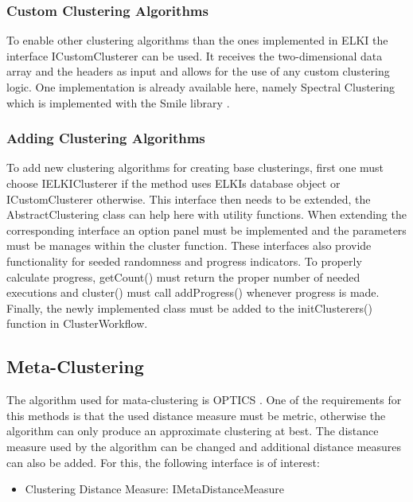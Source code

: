 \documentclass[
	a4paper,
	english,
	twoside,
	openright,               
	11pt                            
	]{report}
\begin{document}
\subsubsection{Custom Clustering Algorithms}
To enable other clustering algorithms than the ones implemented in ELKI the interface ICustomClusterer can be used. It receives the two-dimensional data array and the headers as input and allows for the use of any custom clustering logic. One implementation is already available here, namely Spectral Clustering which is implemented with the Smile library \cite{javasmile}.
 
\subsubsection*{Adding Clustering Algorithms}
To add new clustering algorithms for creating base clusterings, first one must choose IELKIClusterer if the method uses ELKIs database object or ICustomClusterer otherwise. This interface then needs to be extended, the AbstractClustering class can help here with utility functions. When extending the corresponding interface an option panel must be implemented and the parameters must be manages within the cluster function. These interfaces also provide functionality for seeded randomness and progress indicators. To properly calculate progress, getCount() must return the proper number of needed executions and cluster() must call addProgress() whenever progress is made. Finally, the newly implemented class must be added to the initClusterers() function in ClusterWorkflow.


\subsection{Meta-Clustering}
The algorithm used for mata-clustering is OPTICS \cite{10.1145/304181.304187}. One of the requirements for this methods is that the used distance measure must be metric, otherwise the algorithm can only produce an approximate clustering at best. The distance measure used by the algorithm can be changed and additional distance measures can also be added. For this, the following interface is of interest:

\begin{itemize}
  \item Clustering Distance Measure: IMetaDistanceMeasure
\end{itemize}
\end{document}
